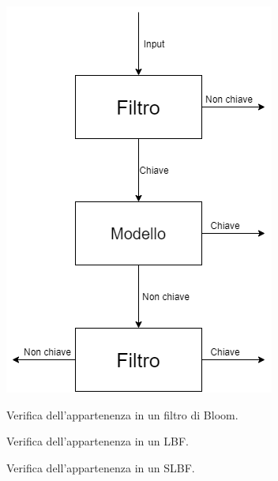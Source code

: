 \documentclass{beamer}
\begin{document}
\begin{frame}
\begin{figure}[htbp]
\begin{minipage}{0.30\textwidth}
        \includegraphics[width=\textwidth]{immagini/5_2/SLBF.png}
        \end{minipage}
    
        \begin{minipage}[t]{0.30\textwidth}
        \caption{Verifica dell'appartenenza in un filtro di Bloom.}
        \end{minipage}%
        \hfill
        \begin{minipage}[t]{0.30\textwidth}
        \caption{Verifica dell'appartenenza in un LBF.}
        \end{minipage}
        \hfill
        \begin{minipage}[t]{0.30\textwidth}
        \caption{Verifica dell'appartenenza in un SLBF.}
        \end{minipage}
    \end{figure}
\end{frame}
\end{document}
